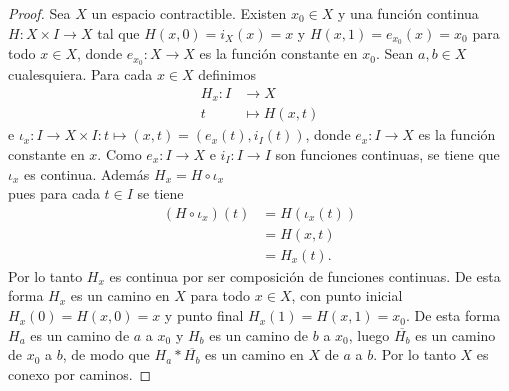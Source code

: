 \begin{proof}
   Sea $X$ un espacio contractible. Existen $x_0\in X$ y una función continua $H:X\times I\to X$ tal que $H(x,0)=i_X(x)=x$ y $H(x,1)=e_{x_0}(x)=x_0$ para todo $x\in X$, donde $e_{x_0}:X\to X$ es la función constante en $x_0$. Sean $a,b\in X$ cualesquiera. Para cada $x\in X$ definimos
      \[
      \begin{aligned}
      H_x \colon I &\longrightarrow X \\
      t &\longmapsto H(x,t)
      \end{aligned}
      \]
      e $\iota_x:I\to X\times I:t\mapsto (x,t)=(e_x(t),i_I(t))$, donde $e_x:I\to X$ es la función constante en $x$. Como $e_x:I\to X$ e $i_I:I\to I$ son funciones continuas, se tiene que $\iota_x$ es continua. Además $H_x=H\circ\iota_x$\\
      
      pues para cada $t\in I$ se tiene
      $$
      \begin{aligned}
         (H\circ\iota_x)(t) &= H(\iota_x(t))\\
                            &= H(x,t)\\
                            &= H_x(t).
      \end{aligned}
      $$
      Por lo tanto $H_x$ es continua por ser composición de funciones continuas. De esta forma $H_x$ es un camino en $X$ para todo $x\in X$, con punto inicial $H_x(0)=H(x,0)=x$ y punto final $H_x(1)=H(x,1)=x_0$. De esta forma $H_a$ es un camino de $a$ a $x_0$ y $H_b$ es un camino de $b$ a $x_0$, luego $\overline{H_b}$ es un camino de $x_0$ a $b$, de modo que $H_a*\overline{H_b}$ es un camino en $X$ de $a$ a $b$. Por lo tanto $X$ es conexo por caminos.
\end{proof}
